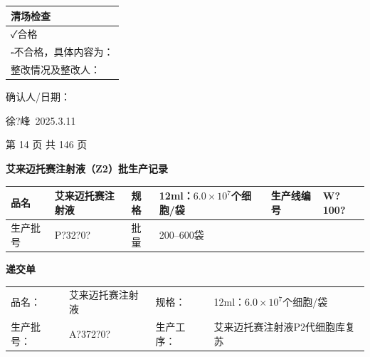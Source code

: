 \documentclass[UTF8,10pt,a4paper,fontset=fandol]{ctexart}
\newcommand{\fieldvalue}[1]{#1}
\newcommand{\handwritten}[1]{#1}
\begin{document}
\begin{tabularx}{\textwidth}{|X|}
\hline
清场检查 \\
\hline
\fieldvalue{\handwritten{✓}}合格 \\
\hline
$\square$不合格，具体内容为： \\
\hline
整改情况及整改人： \\
\hline
\end{tabularx}

\medskip

确认人/日期：

\fieldvalue{\handwritten{徐?峰\ 2025.3.11}}

\begin{center}
第 14 页 共 146 页
\end{center}

\newpage

\begin{center}
\textbf{艾来迈托赛注射液（Z2）批生产记录}
\end{center}

\noindent
\begin{tabularx}{\textwidth}{|l|X|l|X|l|X|}
\hline
品名 &
\fieldvalue{艾来迈托赛注射液} &
规格 &
\fieldvalue{12ml：$6.0\times10^{7}$个细胞/袋} &
生产线编号 &
\fieldvalue{\handwritten{W?100?}} \\
\hline
生产批号 &
\fieldvalue{\handwritten{P?32?0?}} &
批量 &
\fieldvalue{200--600袋} & & \\
\hline
\end{tabularx}

\vspace{0.5em}

\begin{center}
\textbf{递交单}
\end{center}

\noindent
\begin{tabularx}{\textwidth}{@{}lXlX@{}}
品名：&
\fieldvalue{艾来迈托赛注射液} &
规格：&
\fieldvalue{12ml：$6.0\times10^{7}$个细胞/袋} \\
生产批号：&
\fieldvalue{\handwritten{A?372?0?}} &
生产工序：&
\fieldvalue{艾来迈托赛注射液P2代细胞库复苏} \\
\end{tabularx}
\end{document}
